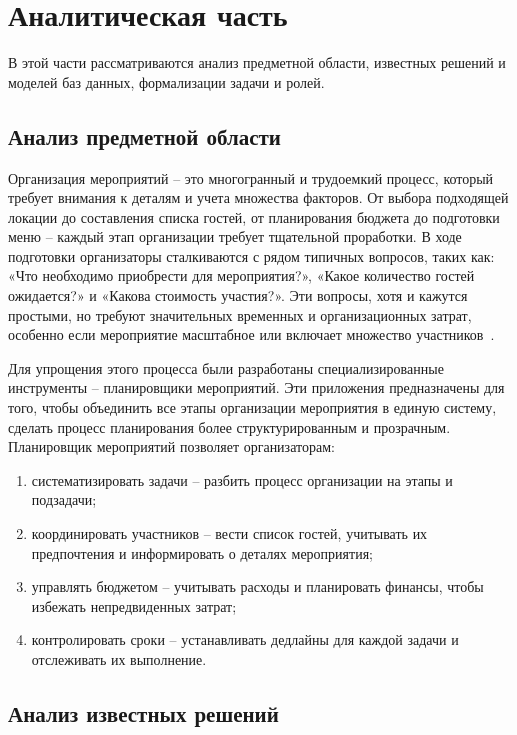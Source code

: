 \chapter{Аналитическая часть}

В этой части рассматриваются анализ предметной области, известных решений и моделей баз данных, формализации задачи и ролей.

\section{Анализ предметной области}

Организация мероприятий -- это многогранный и трудоемкий процесс, который требует внимания к деталям и учета множества факторов. От выбора подходящей локации до составления списка гостей, от планирования бюджета до подготовки меню -- каждый этап организации требует тщательной проработки. В ходе подготовки организаторы сталкиваются с рядом типичных вопросов, таких как: «Что необходимо приобрести для мероприятия?», «Какое количество гостей ожидается?» и «Какова стоимость участия?». Эти вопросы, хотя и кажутся простыми, но требуют значительных временных и организационных затрат, особенно если мероприятие масштабное или включает множество участников~\cite{lit1}.

Для упрощения этого процесса были разработаны специализированные инструменты -- планировщики мероприятий. Эти приложения предназначены для того, чтобы объединить все этапы организации мероприятия в единую систему, сделать процесс планирования более структурированным и прозрачным. Планировщик мероприятий позволяет организаторам:
\begin{enumerate}
	\item систематизировать задачи -- разбить процесс организации на этапы и подзадачи;
	\item координировать участников -- вести список гостей, учитывать их предпочтения и информировать о деталях мероприятия;
	\item управлять бюджетом -- учитывать расходы и планировать финансы, чтобы избежать непредвиденных затрат;
	\item контролировать сроки -- устанавливать дедлайны для каждой задачи и отслеживать их выполнение.
\end{enumerate}


\section{Анализ известных решений}

